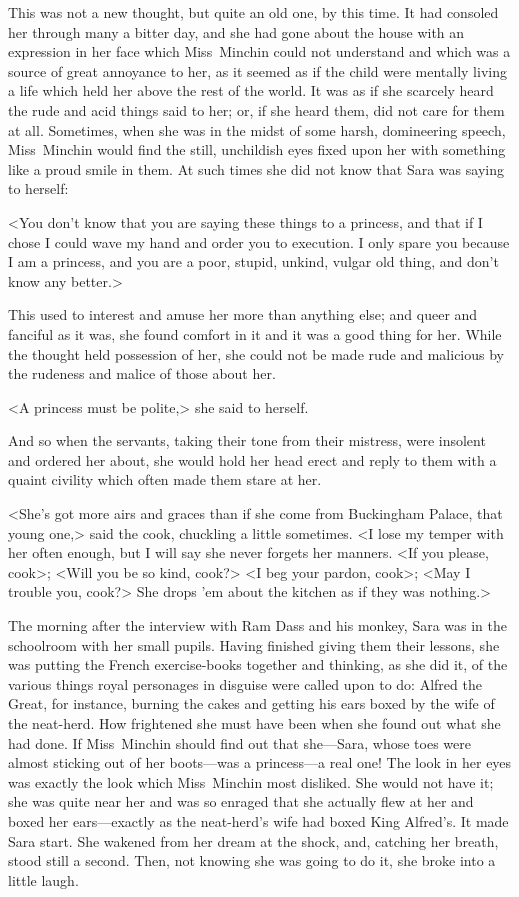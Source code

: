 This was not a new thought, but quite an old one, by this time. It had consoled her through many a bitter day, and she had gone about the house with an expression in her face which Miss~Minchin could not understand and which was a source of great annoyance to her, as it seemed as if the child were mentally living a life which held her above the rest of the world. It was as if she scarcely heard the rude and acid things said to her; or, if she heard them, did not care for them at all. Sometimes, when she was in the midst of some harsh, domineering speech, Miss~Minchin would find the still, unchildish eyes fixed upon her with something like a proud smile in them. At such times she did not know that Sara was saying to herself:

<You don't know that you are saying these things to a princess, and that if I chose I could wave my hand and order you to execution. I only spare you because I am a princess, and you are a poor, stupid, unkind, vulgar old thing, and don't know any better.>

This used to interest and amuse her more than anything else; and queer and fanciful as it was, she found comfort in it and it was a good thing for her. While the thought held possession of her, she could not be made rude and malicious by the rudeness and malice of those about her.

<A princess must be polite,> she said to herself.

And so when the servants, taking their tone from their mistress, were insolent and ordered her about, she would hold her head erect and reply to them with a quaint civility which often made them stare at her.

<She's got more airs and graces than if she come from Buckingham Palace, that young one,> said the cook, chuckling a little sometimes. <I lose my temper with her often enough, but I will say she never forgets her manners. <If you please, cook>; <Will you be so kind, cook?> <I beg your pardon, cook>; <May I trouble you, cook?> She drops 'em about the kitchen as if they was nothing.>

The morning after the interview with Ram Dass and his monkey, Sara was in the schoolroom with her small pupils. Having finished giving them their lessons, she was putting the French exercise-books together and thinking, as she did it, of the various things royal personages in disguise were called upon to do: Alfred the Great, for instance, burning the cakes and getting his ears boxed by the wife of the neat-herd. How frightened she must have been when she found out what she had done. If Miss~Minchin should find out that she—Sara, whose toes were almost sticking out of her boots—was a princess—a real one! The look in her eyes was exactly the look which Miss~Minchin most disliked. She would not have it; she was quite near her and was so enraged that she actually flew at her and boxed her ears—exactly as the neat-herd's wife had boxed King Alfred's. It made Sara start. She wakened from her dream at the shock, and, catching her breath, stood still a second. Then, not knowing she was going to do it, she broke into a little laugh.

